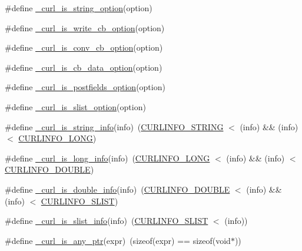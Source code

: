 \begin{DoxyCompactItemize}
\item 
\#define \hyperlink{typecheck-gcc_8h_a4d77b565e583b9e9e25dc7473a62c558}{\+\_\+curl\+\_\+is\+\_\+string\+\_\+option}(option)
\item 
\#define \hyperlink{typecheck-gcc_8h_afa2b47b2fb3f3cb1b30f1459e3e83dba}{\+\_\+curl\+\_\+is\+\_\+write\+\_\+cb\+\_\+option}(option)
\item 
\#define \hyperlink{typecheck-gcc_8h_a084944a41877f383164cdf0948be6a77}{\+\_\+curl\+\_\+is\+\_\+conv\+\_\+cb\+\_\+option}(option)
\item 
\#define \hyperlink{typecheck-gcc_8h_ab5e9dc6fafd6cce2e360fd41926cbbb6}{\+\_\+curl\+\_\+is\+\_\+cb\+\_\+data\+\_\+option}(option)
\item 
\#define \hyperlink{typecheck-gcc_8h_a219ab470b025e5855351c8f724d4d053}{\+\_\+curl\+\_\+is\+\_\+postfields\+\_\+option}(option)
\item 
\#define \hyperlink{typecheck-gcc_8h_abd91cfa02052fdf27f2d2278480f2601}{\+\_\+curl\+\_\+is\+\_\+slist\+\_\+option}(option)
\item 
\#define \hyperlink{typecheck-gcc_8h_abc3d0fb5cacf1e53fd1767653fdcd0db}{\+\_\+curl\+\_\+is\+\_\+string\+\_\+info}(info)~(\hyperlink{curl_8h_a2df6a052fcaceae309702c24d19ce5f5}{C\+U\+R\+L\+I\+N\+F\+O\+\_\+\+S\+T\+R\+I\+N\+G} $<$ (info) \&\& (info) $<$ \hyperlink{curl_8h_ad7be151454940ae2241677a25623ff4d}{C\+U\+R\+L\+I\+N\+F\+O\+\_\+\+L\+O\+N\+G})
\item 
\#define \hyperlink{typecheck-gcc_8h_adc6e9332b579cdab463112cf9a66c403}{\+\_\+curl\+\_\+is\+\_\+long\+\_\+info}(info)~(\hyperlink{curl_8h_ad7be151454940ae2241677a25623ff4d}{C\+U\+R\+L\+I\+N\+F\+O\+\_\+\+L\+O\+N\+G} $<$ (info) \&\& (info) $<$ \hyperlink{curl_8h_a363ca12d0c8bf659e5464e4b04b8606c}{C\+U\+R\+L\+I\+N\+F\+O\+\_\+\+D\+O\+U\+B\+L\+E})
\item 
\#define \hyperlink{typecheck-gcc_8h_a82d678e9c71e7c6fb9a0eb798eba3eea}{\+\_\+curl\+\_\+is\+\_\+double\+\_\+info}(info)~(\hyperlink{curl_8h_a363ca12d0c8bf659e5464e4b04b8606c}{C\+U\+R\+L\+I\+N\+F\+O\+\_\+\+D\+O\+U\+B\+L\+E} $<$ (info) \&\& (info) $<$ \hyperlink{curl_8h_a49a110fda25ca4982e67a0c547f0826c}{C\+U\+R\+L\+I\+N\+F\+O\+\_\+\+S\+L\+I\+S\+T})
\item 
\#define \hyperlink{typecheck-gcc_8h_ae64e7d84fcc0a5f297e7cd11f4003694}{\+\_\+curl\+\_\+is\+\_\+slist\+\_\+info}(info)~(\hyperlink{curl_8h_a49a110fda25ca4982e67a0c547f0826c}{C\+U\+R\+L\+I\+N\+F\+O\+\_\+\+S\+L\+I\+S\+T} $<$ (info))
\item 
\#define \hyperlink{typecheck-gcc_8h_a6262734b3ea5822848f25ead84674736}{\+\_\+curl\+\_\+is\+\_\+any\+\_\+ptr}(expr)~(sizeof(expr) == sizeof(void$\ast$))

\end{DoxyCompactItemize}
